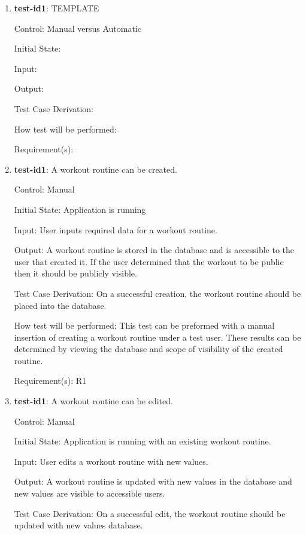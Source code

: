 \documentclass[12pt, titlepage]{article}
\begin{document}
	\begin{enumerate}
		
		\item{\textbf{test-id1}}: TEMPLATE
		
		Control: Manual versus Automatic
		
		Initial State: 
		
		Input: 
		
		Output: 
		
		Test Case Derivation: 
		
		How test will be performed:
		
		Requirement(s): 
		
		\item{\textbf{test-id1}}: A workout routine can be created.
		
		Control: Manual
		
		Initial State: Application is running
		
		Input: User inputs required data for a workout routine.
		
		Output: A workout routine is stored in the database and is accessible to the user that created it. If the user determined that the workout to be public then it should be publicly visible.
		
		Test Case Derivation: On a successful creation, the workout routine should be placed into the database.
		
		How test will be performed: This test can be preformed with a manual insertion of creating a workout routine under a test user. These results can be determined by viewing the database and scope of visibility of the created routine.
		
		Requirement(s): R1
		
		\item{\textbf{test-id1}}: A workout routine can be edited.
		
		Control: Manual
		
		Initial State: Application is running with an existing workout routine.
		
		Input: User edits a workout routine with new values.
		
		Output: A workout routine is updated with new values in the database and new values are visible to accessible users.
		
		Test Case Derivation: On a successful edit, the workout routine should be updated with new values database.
		

\end{enumerate}
\end{document}
